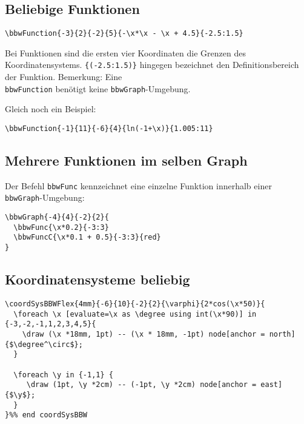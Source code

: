 \subsection{Beliebige Funktionen}
\begin{verbatim}
\bbwFunction{-3}{2}{-2}{5}{-\x*\x - \x + 4.5}{-2.5:1.5}
\end{verbatim}

Bei Funktionen sind die ersten vier Koordinaten die Grenzen des Koordinatensystems. \texttt{\{(-2.5:1.5)\}} hingegen bezeichnet den Definitionsbereich der Funktion.
Bemerkung: Eine \texttt{\\bbwFunction} benötigt
keine \texttt{bbwGraph}-Umgebung.
\newpage

Gleich noch ein Beispiel:

\begin{verbatim}
\bbwFunction{-1}{11}{-6}{4}{ln(-1+\x)}{1.005:11}
\end{verbatim}
\newpage


\subsection{Mehrere Funktionen im selben Graph}
Der Befehl \texttt{bbwFunc} kennzeichnet eine einzelne Funktion
innerhalb einer \texttt{bbwGraph}-Umgebung:

\begin{verbatim}
\bbwGraph{-4}{4}{-2}{2}{
  \bbwFunc{\x*0.2}{-3:3}
  \bbwFuncC{\x*0.1 + 0.5}{-3:3}{red}
}
\end{verbatim}


\subsection{Koordinatensysteme beliebig}

\begin{verbatim}
\coordSysBBWFlex{4mm}{-6}{10}{-2}{2}{\varphi}{2*cos(\x*50)}{
  \foreach \x [evaluate=\x as \degree using int(\x*90)] in {-3,-2,-1,1,2,3,4,5}{ 
    \draw (\x *18mm, 1pt) -- (\x * 18mm, -1pt) node[anchor = north] {$\degree^\circ$};
  }
   
  \foreach \y in {-1,1} {
     \draw (1pt, \y *2cm) -- (-1pt, \y *2cm) node[anchor = east] {$\y$};
  }
}%% end coordSysBBW

\end{verbatim}

